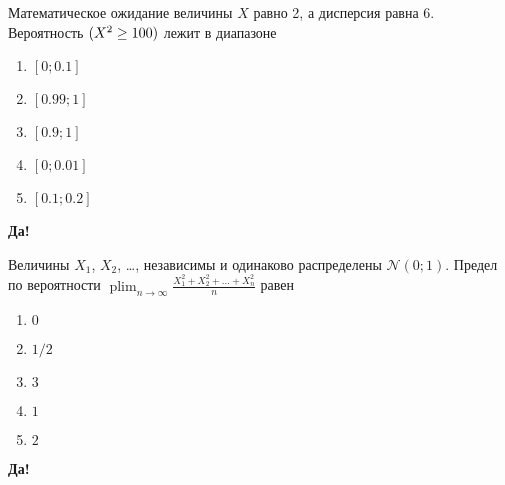 \documentclass[t]{beamer}
\DeclareMathOperator*\plim{plim}
\let\P\relax
\DeclareMathOperator{\P}{\mathbb{P}}
\newcommand{\cN}{\mathcal{N}}
\begin{document}
 \begin{frame} \label{34-Yes} 
\begin{block}{34} 

Математическое ожидание величины $X$ равно 2, а дисперсия равна 6. Вероятность $\P(X^2 \geq 100)$ лежит в диапазоне
  


 \end{block} 
\begin{enumerate} 
\item[] \hyperlink{34-Yes}{\beamergotobutton{} $[0;0.1]$}
\item[] \hyperlink{34-No}{\beamergotobutton{} $[0.99;1]$}
\item[] \hyperlink{34-No}{\beamergotobutton{} $[0.9;1]$}
\item[] \hyperlink{34-No}{\beamergotobutton{} $[0;0.01]$}
\item[] \hyperlink{34-No}{\beamergotobutton{} $[0.1;0.2]$}
\end{enumerate} 

 \textbf{Да!} 
 \hyperlink{35}{}\end{frame} 


 \begin{frame} \label{35-Yes} 
\begin{block}{35} 

Величины $X_1$, $X_2$, \ldots, независимы и одинаково распределены $\cN(0;1)$. Предел по вероятности $\plim_{n\to\infty} \frac{X_1^2+ X_2^2 + \ldots + X_n^2}{n}$ равен
 


 \end{block} 
\begin{enumerate} 
\item[] \hyperlink{35-No}{\beamergotobutton{} $0$}
\item[] \hyperlink{35-No}{\beamergotobutton{} $1/2$}
\item[] \hyperlink{35-No}{\beamergotobutton{} $3$}
\item[] \hyperlink{35-Yes}{\beamergotobutton{} $1$}
\item[] \hyperlink{35-No}{\beamergotobutton{} $2$}
\end{enumerate} 

 \textbf{Да!} 
 \hyperlink{36}{}\end{frame} 
\end{document}
